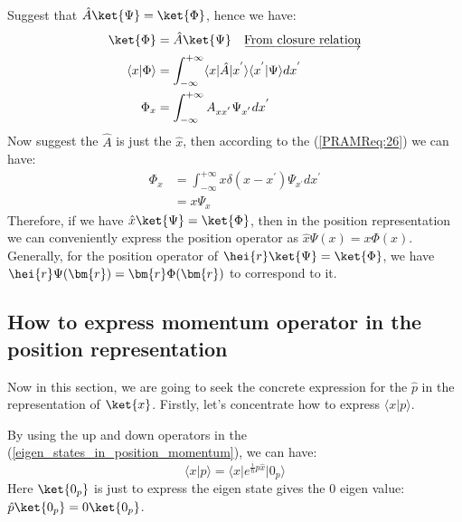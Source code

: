 Suggest that $\hat{A}\ket{\Psi} = \ket{\Phi}$, hence we have:
\begin{equation}\label{PRAMReq:25}
\begin{split}
  \ket{\Phi} &= \hat{A}\ket{\Psi} \quad
  \underrightarrow{\text{From closure relation}} \\
  \langle x|\Phi \rangle &= \int^{+\infty}_{-\infty} \langle
  x|\hat{A}|x^{'} \rangle \langle x^{'}|\Psi
  \rangle dx^{'}\\
  \Phi_{x} &= \int^{+\infty}_{-\infty} A_{xx^{'}}\Psi_{x^{'}}dx^{'}
\end{split}
\end{equation}
Now suggest the $\hat{A}$ is just the $\hat{x}$, then according to the
(\ref{PRAMReq:26}) we can have:
\begin{equation}\label{PRAMReq:23}
  \begin{split}
      \Phi_{x} &= \int^{+\infty}_{-\infty} x \delta(x -
      x^{'})\Psi_{x^{'}}dx^{'} \\
&= x \Psi_{x}
  \end{split}
\end{equation}
Therefore, if we have $\hat{x}\ket{\Psi} = \ket{\Phi}$, then in the
position representation we can conveniently express the position
operator as $\hat{x}\Psi(x) = x\Phi(x)$. Generally, for the position
operator of $\hei{r}\ket{\Psi} = \ket{\Phi}$, we have
$\hei{r}\Psi(\bm{r}) = \bm{r}\Phi(\bm{r})$ to correspond to it.

\subsection{How to express momentum operator in the position
  representation}
\label{sec:momentum_operator_in_position_momentum}
%
%
%
%
%
Now in this section, we are going to seek the concrete expression for
the $\hat{p}$ in the representation of $\ket{x}$. Firstly, let's
concentrate how to express $\langle x|p \rangle$.

By using the up and down operators in the
(\ref{eigen_states_in_position_momentum}), we can have:
\begin{equation}
  \label{PRAMReq:24}
  \langle x|p \rangle = \langle x|e^{\frac{i}{\hbar}p\hat{x}}|0_{p}
  \rangle
\end{equation}
Here $\ket{0_{p}}$ is just to express the eigen state gives the $0$
eigen value: $\hat{p}\ket{0_{p}} = 0\ket{0_{p}}$.

